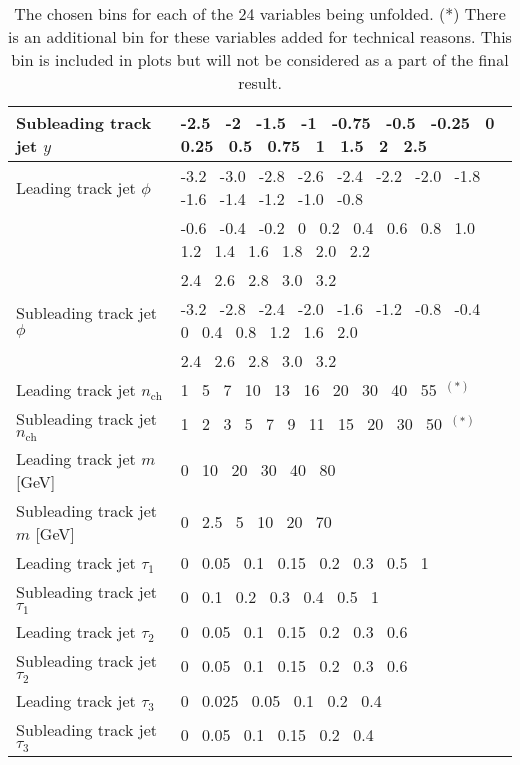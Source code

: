 \begin{itemize}
\begin{table}[h!]
\begin{tabular}{l|l}
       Subleading track jet $y$                & -2.5~ -2~ -1.5~ -1~ -0.75~ -0.5~ -0.25~ 0~ 0.25~ 0.5~ 0.75~ 1~ 1.5~ 2~ 2.5 \\ \hline
       Leading track jet $\phi$                & -3.2~ -3.0~ -2.8~ -2.6~ -2.4~ -2.2~ -2.0~ -1.8~ -1.6~ -1.4~ -1.2~ -1.0~ -0.8~ \\
                                               & -0.6~ -0.4~ -0.2~ 0~ 0.2~ 0.4~ 0.6~ 0.8~ 1.0~ 1.2~ 1.4~ 1.6~ 1.8~ 2.0~ 2.2~ \\
                                               & 2.4~ 2.6~ 2.8~ 3.0~ 3.2 \\ \hline
       Subleading track jet $\phi$             & -3.2~ -2.8~ -2.4~ -2.0~ -1.6~ -1.2~ -0.8~ -0.4~ 0~ 0.4~ 0.8~ 1.2~ 1.6~ 2.0~ \\
                                               & 2.4~ 2.6~ 2.8~ 3.0~ 3.2 \\ \hline
       Leading track jet $n_{\text{ch}}$       & 1~ 5~ 7~ 10~ 13~ 16~ 20~ 30~ 40~ 55~$^{(*)}$ \\ \hline
       Subleading track jet $n_{\text{ch}}$    & 1~ 2~ 3~ 5~ 7~ 9~ 11~ 15~ 20~ 30~ 50~$^{(*)}$ \\ \hline
       Leading track jet $m$ [GeV]             & 0~ 10~ 20~ 30~ 40~ 80 \\ \hline
       Subleading track jet $m$ [GeV]          & 0~ 2.5~ 5~ 10~ 20~ 70 \\ \hline
       Leading track jet $\tau_1$              & 0~ 0.05~ 0.1~ 0.15~ 0.2~ 0.3~ 0.5~ 1 \\ \hline
       Subleading track jet $\tau_1$           & 0~ 0.1~ 0.2~ 0.3~ 0.4~ 0.5~ 1 \\ \hline
       Leading track jet $\tau_2$              & 0~ 0.05~ 0.1~ 0.15~ 0.2~ 0.3~ 0.6 \\ \hline
       Subleading track jet $\tau_2$           & 0~ 0.05~ 0.1~ 0.15~ 0.2~ 0.3~ 0.6 \\ \hline
       Leading track jet $\tau_3$              & 0~ 0.025~ 0.05~ 0.1~ 0.2~ 0.4 \\ \hline
       Subleading track jet $\tau_3$           & 0~ 0.05~ 0.1~ 0.15~ 0.2~ 0.4 \\ \hline

       \end{tabular}
       \caption{The chosen bins for each of the 24 variables being unfolded. (*) There is an additional bin for these variables added for technical reasons. This bin is included in plots but will not be considered as a part of the final result.}
       \label{tab:IBUBins}
   \end{table}


\end{itemize}
